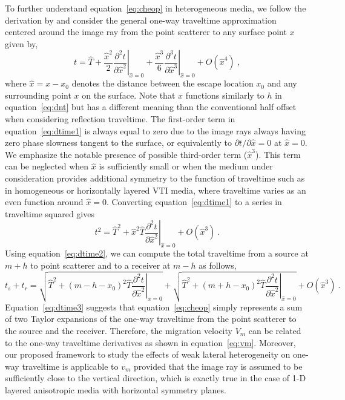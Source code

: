To further understand equation~\ref{eq:cheop} in heterogeneous media, we follow the derivation by \cite{cam2007} and consider the general one-way traveltime approximation centered around the image ray from the point scatterer to any surface point $x$ given by,
\begin{equation}
\label{eq:dtime1}
t = \hat{T} + \frac{\hat{x}^2}{2} \left.\frac{\partial^2 t}{\partial \hat{x}^2}\right\rvert_{\hat{x}=0} + \frac{\hat{x}^3}{6} \left.\frac{\partial^3 t}{\partial \hat{x}^3}\right\rvert_{\hat{x}=0} + O(\hat{x}^4)~,
\end{equation}
where $\hat{x} = x-x_0$ denotes the distance between the escape location $x_0$ and any surrounding point $x$ on the surface. Note that $\hat{x}$ functions similarly to $h$ in equation~\ref{eq:dnt} but has a different meaning than the conventional half offset when considering reflection traveltime. The first-order term in equation~\ref{eq:dtime1} is always equal to zero due to the image rays always having zero phase slowness tangent to the surface, or equivalently to $\partial t/\partial \hat{x} = 0 $ at $\hat{x}=0$. We emphasize the notable presence of possible third-order term ($\hat{x}^3$). This term can be neglected when $\hat{x}$ is sufficiently small or when the medium under consideration provides additional symmetry to the function of traveltime such as in homogeneous or horizontally layered VTI media, where traveltime varies as an even function around $\hat{x}=0$. Converting equation~\ref{eq:dtime1} to a series in traveltime squared gives
\begin{equation}
\label{eq:dtime2}
t^2 = \hat{T}^2 + \hat{x}^2 \hat{T}\left.\frac{\partial^2 t}{\partial \hat{x}^2}\right\rvert_{\hat{x}=0} + O(\hat{x}^3)~.
\end{equation}
Using equation~\ref{eq:dtime2}, we can compute the total traveltime from a source at $m+h$ to point scatterer and to a receiver at $m-h$ as follows,
\begin{equation}
\label{eq:dtime3}
t_s + t_r = \sqrt{\hat{T}^2 + (m-h-x_0)^2 \hat{T}\left.\frac{\partial^2 t}{\partial \hat{x}^2}\right\rvert_{\hat{x}=0}} + \sqrt{\hat{T}^2 + (m+h-x_0)^2 \hat{T}\left.\frac{\partial^2 t}{\partial \hat{x}^2}\right\rvert_{\hat{x}=0}} + O(\hat{x}^3)~.
\end{equation}
Equation~\ref{eq:dtime3} suggests that equation~\ref{eq:cheop} simply represents a sum of two Taylor expansions of the one-way traveltime from the point scatterer to the source and the receiver. Therefore, the migration velocity $V_m$ can be related to the one-way traveltime derivatives as shown in equation~\ref{eq:vm}. Moreover, our proposed framework to study the effects of weak lateral heterogeneity on one-way traveltime is applicable to $v_m$ provided that the image ray is assumed to be sufficiently close to the vertical direction, which is exactly true in the case of 1-D layered anisotropic media with horizontal symmetry planes.




